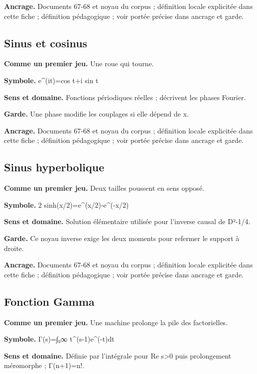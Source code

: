\documentclass[
  9pt,
  a4paper,
]{article}
\begin{document}
\textbf{Ancrage.} Documents 67-68 et noyau du corpus ; définition locale
explicitée dans cette fiche ; définition pédagogique ; voir portée
précise dans ancrage et garde.

\hypertarget{sinus-et-cosinus}{%
\subsection{Sinus et cosinus}\label{sinus-et-cosinus}}

\textbf{Comme un premier jeu.} Une roue qui tourne.

\textbf{Symbole.} e\^{}(it)=cos t+i sin t

\textbf{Sens et domaine.} Fonctions périodiques réelles ; décrivent les
phases Fourier.

\textbf{Garde.} Une phase modifie les couplages si elle dépend de x.

\textbf{Ancrage.} Documents 67-68 et noyau du corpus ; définition locale
explicitée dans cette fiche ; définition pédagogique ; voir portée
précise dans ancrage et garde.

\hypertarget{sinus-hyperbolique}{%
\subsection{Sinus hyperbolique}\label{sinus-hyperbolique}}

\textbf{Comme un premier jeu.} Deux tailles poussent en sens opposé.

\textbf{Symbole.} 2 sinh(x/2)=e\^{}(x/2)-e\^{}(-x/2)

\textbf{Sens et domaine.} Solution élémentaire utilisée pour l'inverse
causal de D²-1/4.

\textbf{Garde.} Ce noyau inverse exige les deux moments pour refermer le
support à droite.

\textbf{Ancrage.} Documents 67-68 et noyau du corpus ; définition locale
explicitée dans cette fiche ; définition pédagogique ; voir portée
précise dans ancrage et garde.

\hypertarget{fonction-gamma}{%
\subsection{Fonction Gamma}\label{fonction-gamma}}

\textbf{Comme un premier jeu.} Une machine prolonge la pile des
factorielles.

\textbf{Symbole.} Γ(s)=∫₀∞ t\^{}(s-1)e\^{}(-t)dt

\textbf{Sens et domaine.} Définie par l'intégrale pour Re s\textgreater0
puis prolongement méromorphe ; Γ(n+1)=n!.
\end{document}
